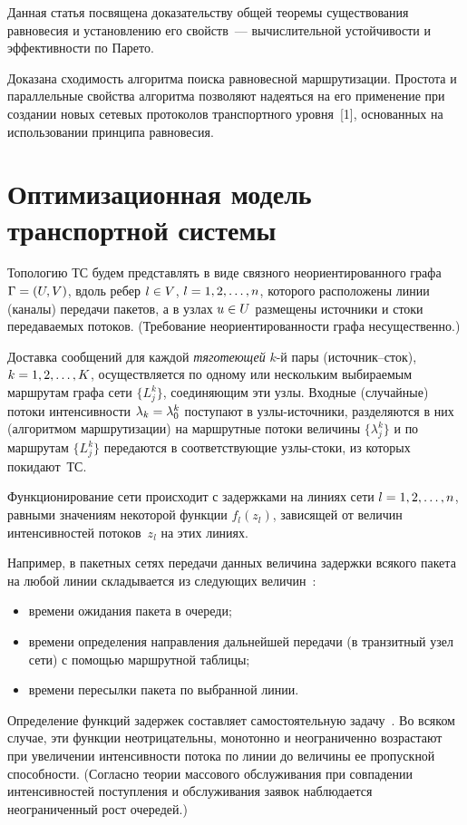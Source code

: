 \begin{multicols}{2}
  Данная статья посвящена доказательству общей теоремы существования 
равновесия и установлению его свойств~--- вычислительной устойчивости и 
эффективности по Парето. 
  
  Доказана сходимость алгоритма поиска равновесной маршрутизации. Простота и 
параллельные свойства алгоритма позволяют надеяться на его применение при 
создании новых сетевых протоколов транспортного уровня~[1], основанных на 
использовании принципа равновесия. 
  
  \section{Оптимизационная модель транспортной системы}
  
  Топологию ТС будем представлять в виде связного неориентированного графа 
$\Gamma\hm = (U,V)$, вдоль ребер $l\hm\in V$, $l\hm= 1, 2,\ldots , n$, которого 
расположены линии (каналы) передачи пакетов, а в узлах $u\hm\in U$ размещены 
источники и стоки передаваемых потоков. (Требование неориентированности графа 
несущественно.) 
  
  Доставка сообщений для каждой \textit{тяготеющей} $k$-й пары 
  (ис\-точ\-ник--сток), $k\hm=1, 2, \ldots ,K$, осуществляется по одному или 
нескольким выбираемым маршрутам графа сети $\{L_j^k\}$, соединяющим эти 
узлы. Входные (случайные) потоки интенсивности $\lambda_k\hm=\lambda_0^k$ 
поступают в узлы-источники, разделяются в них (алгоритмом маршрутизации) на 
маршрутные потоки величины $\{\lambda_j^k\}$ и по маршрутам $\{L_j^k\}$ 
передаются в соответствующие уз\-лы-сто\-ки, из которых покидают~ТС. 
  
   Функционирование сети происходит с задержками на линиях сети $l\hm=1, 2, 
\ldots , n$, равными значениям некоторой функции $f_l(z_l)$, зависящей от величин 
интенсивностей потоков~$z_l$ на этих ли\-ниях.
   
  Например, в пакетных сетях передачи данных величина задержки всякого пакета 
на любой линии складывается из следующих величин~\cite{1-vasil, 8-vasil}:
 \begin{itemize}
\item времени ожидания пакета в очереди; 
\item времени определения направления дальнейшей передачи (в транзитный 
узел сети) с помощью маршрутной таблицы; 
\item времени пересылки пакета по выбранной линии.
\end{itemize}

  Определение функций задержек составляет самостоятельную 
  задачу~\cite{1-vasil, 8-vasil, 9-vasil}. Во всяком случае, эти функции 
неотрицательны, монотонно и неограниченно возрастают при увеличении 
интенсивности потока по линии до величины ее пропускной способности. 
(Согласно теории массового обслуживания при совпадении интенсивностей 
поступления и обслуживания заявок наблюдается неограниченный рост очередей.)
  

\end{multicols}
